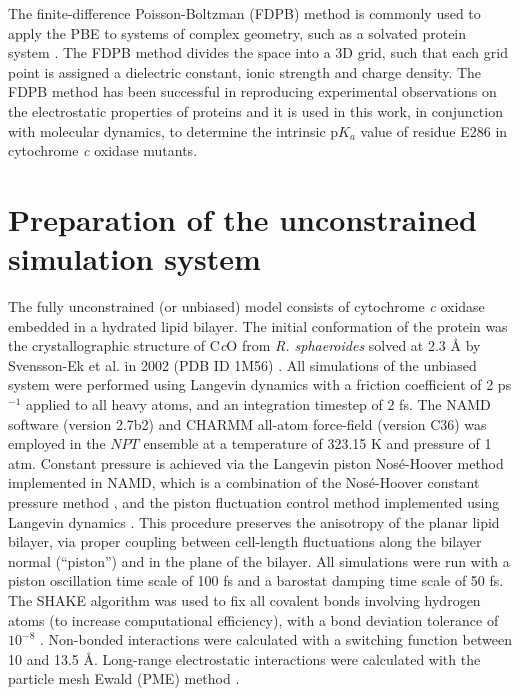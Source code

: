 The finite-difference Poisson-Boltzman (FDPB) method is commonly used to apply the PBE to systems of complex geometry, such as a solvated protein system \cite{AguilellaArzo:2010p10956,Bashford:2004p10958}. The FDPB method divides the space into a 3D grid, such that each grid point is assigned a dielectric constant, ionic strength and charge density. The FDPB method has been successful in reproducing experimental observations on the electrostatic properties of proteins \cite{Gilson:1991p10947} and it is used in this work, in conjunction with molecular dynamics, to determine the intrinsic p$K_a$ value of residue E286 in cytochrome \emph{c} oxidase mutants.


\section{Preparation of the unconstrained simulation system}

The fully unconstrained (or unbiased) model consists of cytochrome \emph{c} oxidase embedded in a hydrated lipid bilayer. The initial conformation of the protein was the crystallographic structure of C\emph{c}O from \emph{R. sphaeroides} solved at 2.3 Å by Svensson-Ek et al. in 2002 (PDB ID 1M56) \cite{SvenssonEk:2002p5595}. All simulations of the unbiased system were performed using Langevin dynamics with a friction coefficient of 2 ps$^{-1}$ applied to all heavy atoms, and an integration timestep of 2 fs. The NAMD software (version 2.7b2) \cite{Phillips:2005p10251} and CHARMM all-atom force-field (version C36) was employed in the $NPT$ ensemble \cite{Brooks:2009p6618,Klauda:2010p8136} at a temperature of 323.15 K and pressure of 1 atm. Constant pressure is achieved via the Langevin piston Nosé-Hoover method implemented in NAMD, which is a combination of the Nosé-Hoover constant pressure method \cite{Martyna:1994p10578}, and the piston fluctuation control method implemented using Langevin dynamics \cite{Feller:1995p10769}. This procedure preserves the anisotropy of the planar lipid bilayer, via proper coupling between cell-length fluctuations along the bilayer normal (``piston'') and in the plane of the bilayer. All simulations were run with a piston oscillation time scale of 100 fs and a barostat damping time scale of 50 fs. The SHAKE algorithm was used to fix all covalent bonds involving hydrogen atoms (to increase computational efficiency), with a bond deviation tolerance of $10^{-8}$ \cite{Ryckaert:1977p5453}. Non-bonded interactions were calculated with a switching function between 10 and 13.5 Å. Long-range electrostatic interactions were calculated with the
particle mesh Ewald (PME) method \cite{Darden:10089,Essmann:1995p5799}.

